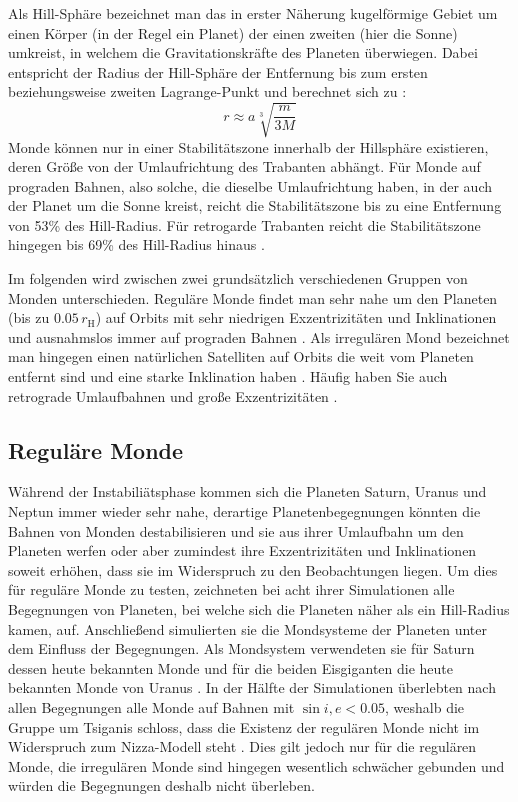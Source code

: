 \documentclass[12pt,a4paper,twoside,open=right,bibliography=totoc]{scrbook}
\renewcommand{\cite}{ \citep}
\begin{document}
Als Hill-Sphäre bezeichnet man das in erster Näherung kugelförmige Gebiet um einen Körper (in der Regel ein Planet) der einen zweiten (hier die Sonne) umkreist, in welchem die Gravitationskräfte des Planeten überwiegen. Dabei entspricht der Radius der Hill-Sphäre der Entfernung bis zum ersten beziehungsweise zweiten Lagrange-Punkt und berechnet sich zu\cite{Sheppard2005}:
\begin{equation} 
r \approx a \sqrt[3]{\frac{m}{3 M}}
\end{equation}
Monde können nur in einer Stabilitätszone innerhalb der Hillsphäre existieren, deren Größe von der Umlaufrichtung des Trabanten abhängt. Für Monde auf prograden Bahnen, also solche, die dieselbe Umlaufrichtung haben, in der auch der Planet um die Sonne kreist, reicht die Stabilitätszone bis zu eine Entfernung von 53\% des Hill-Radius.
Für retrogarde Trabanten reicht die Stabilitätszone hingegen bis 69\% des Hill-Radius hinaus\cite{Hamilton1997}.

Im folgenden wird zwischen zwei grundsätzlich verschiedenen Gruppen von Monden unterschieden.
Reguläre Monde findet man sehr nahe um den Planeten (bis zu $0.05 \, r_\mathrm{H}$) auf Orbits mit sehr niedrigen Exzentrizitäten und Inklinationen und ausnahmslos immer auf prograden Bahnen\cite{Sheppard2005}.
Als irregulären Mond bezeichnet man hingegen einen natürlichen Satelliten auf Orbits die weit vom Planeten entfernt sind und eine starke Inklination haben\cite{Nesvorny2007}.
Häufig haben Sie auch retrograde Umlaufbahnen und große Exzentrizitäten\cite{Nesvorny2007}.

\subsection{Reguläre Monde}
Während der Instabiliätsphase kommen sich die Planeten Saturn, Uranus und Neptun immer wieder sehr nahe, derartige Planetenbegegnungen könnten die Bahnen von Monden destabilisieren und sie aus ihrer Umlaufbahn um den Planeten werfen oder aber zumindest ihre Exzentrizitäten und Inklinationen soweit erhöhen, dass sie im Widerspruch zu den Beobachtungen liegen.
Um dies für reguläre Monde zu testen, zeichneten \cite{Tsiganis2005} bei acht ihrer Simulationen alle Begegnungen von Planeten, bei welche sich die Planeten näher als ein Hill-Radius kamen, auf.
Anschließend simulierten sie die Mondsysteme der Planeten unter dem Einfluss der Begegnungen.
Als Mondsystem verwendeten sie für Saturn dessen heute bekannten Monde und für die beiden Eisgiganten die heute bekannten Monde von Uranus\cite{Tsiganis2005}.
In der Hälfte der Simulationen überlebten nach allen Begegnungen alle Monde auf Bahnen mit $\sin i, e < 0.05$, weshalb die Gruppe um Tsiganis schloss, dass die Existenz der regulären Monde nicht im Widerspruch zum Nizza-Modell steht\cite{Tsiganis2005}.
Dies gilt jedoch nur für die regulären Monde, die irregulären Monde sind hingegen wesentlich schwächer gebunden und würden die Begegnungen deshalb nicht überleben.
\end{document}
